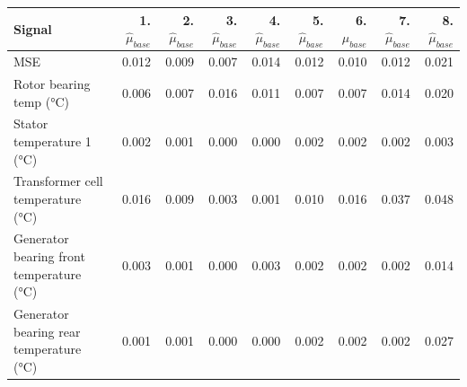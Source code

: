 \begin{tabular}{lrrrrrrrr}
\toprule
Signal & 1. $\hat\mu_{base}$ & 2. $\hat\mu_{base}$ & 3. $\hat\mu_{base}$ & 4. $\hat\mu_{base}$ & 5. $\hat\mu_{base}$ & 6. $\hat\mu_{base}$ & 7. $\hat\mu_{base}$ & 8. $\hat\mu_{base}$ \\
\midrule
MSE & 0.012 & 0.009 & 0.007 & 0.014 & 0.012 & 0.010 & 0.012 & 0.021 \\
Rotor bearing temp (°C) & 0.006 & 0.007 & 0.016 & 0.011 & 0.007 & 0.007 & 0.014 & 0.020 \\
Stator temperature 1 (°C) & 0.002 & 0.001 & 0.000 & 0.000 & 0.002 & 0.002 & 0.002 & 0.003 \\
Transformer cell temperature (°C) & 0.016 & 0.009 & 0.003 & 0.001 & 0.010 & 0.016 & 0.037 & 0.048 \\
Generator bearing front temperature (°C) & 0.003 & 0.001 & 0.000 & 0.003 & 0.002 & 0.002 & 0.002 & 0.014 \\
Generator bearing rear temperature (°C) & 0.001 & 0.001 & 0.000 & 0.000 & 0.002 & 0.002 & 0.002 & 0.027 \\
\bottomrule
\end{tabular}
